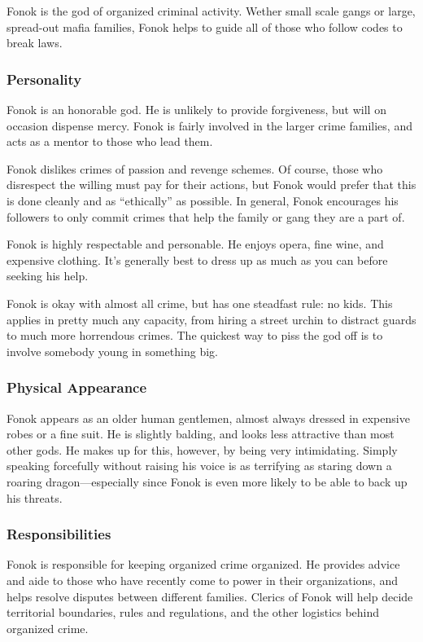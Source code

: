 Fonok is the god of organized criminal activity.
Wether small scale gangs or large, spread-out mafia families, Fonok helps to guide all of those who follow codes to break laws.

\subsubsection{Personality}
Fonok is an honorable god.
He is unlikely to provide forgiveness, but will on occasion dispense mercy.
Fonok is fairly involved in the larger crime families, and acts as a mentor to those who lead them.

Fonok dislikes crimes of passion and revenge schemes.
Of course, those who disrespect the willing must pay for their actions, but Fonok would prefer that this is done cleanly and as ``ethically'' as possible.
In general, Fonok encourages his followers to only commit crimes that help the family or gang they are a part of.

Fonok is highly respectable and personable.
He enjoys opera, fine wine, and expensive clothing.
It's generally best to dress up as much as you can before seeking his help.

Fonok is okay with almost all crime, but has one steadfast rule: no kids.
This applies in pretty much any capacity, from hiring a street urchin to distract guards to much more horrendous crimes.
The quickest way to piss the god off is to involve somebody young in something big.

\subsubsection*{Physical Appearance}

Fonok appears as an older human gentlemen, almost always dressed in expensive robes or a fine suit.
He is slightly balding, and looks less attractive than most other gods.
He makes up for this, however, by being very intimidating.
Simply speaking forcefully without raising his voice is as terrifying as staring down a roaring dragon---especially since Fonok is even more likely to be able to back up his threats.

\subsubsection*{Responsibilities}
Fonok is responsible for keeping organized crime organized.
He provides advice and aide to those who have recently come to power in their organizations, and helps resolve disputes between different families.
Clerics of Fonok will help decide territorial boundaries, rules and regulations, and the other logistics behind organized crime.

